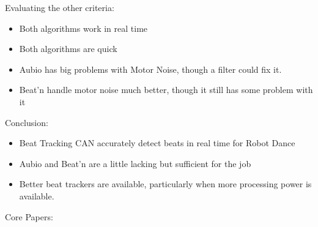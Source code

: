 \documentclass{beamer}
\begin{document}
	\begin{frame}
		Evaluating the other criteria:
		\begin{itemize}
			\item Both algorithms work in real time
			\item Both algorithms are quick
			\item Aubio has big problems with Motor Noise, though a filter could fix it.
			\item Beat'n handle motor noise much better, though it still has some problem with it
		\end{itemize}
	\end{frame}
	\begin{frame}
		Conclusion:
		\begin{itemize}
			\item Beat Tracking CAN accurately detect beats in real time for Robot Dance
			\item Aubio and Beat'n are a little lacking but sufficient for the job
			\item Better beat trackers are available, particularly when more processing power is available.
		\end{itemize}
	\end{frame}
	\begin{frame}
		Core Papers:
		
	\end{frame}
	
\end{document}

